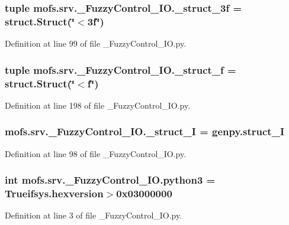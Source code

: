 \subsubsection[{\-\_\-struct\-\_\-3f}]{\setlength{\rightskip}{0pt plus 5cm}tuple mofs.\-srv.\-\_\-\-Fuzzy\-Control\-\_\-\-I\-O.\-\_\-struct\-\_\-3f = struct.\-Struct(\char`\"{}$<$3f\char`\"{})}\label{namespacemofs_1_1srv_1_1__FuzzyControl__IO_aec43b544d356deecb1cc1cf3f0752822}


Definition at line 99 of file \-\_\-\-Fuzzy\-Control\-\_\-\-I\-O.\-py.

\subsubsection[{\-\_\-struct\-\_\-f}]{\setlength{\rightskip}{0pt plus 5cm}tuple mofs.\-srv.\-\_\-\-Fuzzy\-Control\-\_\-\-I\-O.\-\_\-struct\-\_\-f = struct.\-Struct(\char`\"{}$<$f\char`\"{})}\label{namespacemofs_1_1srv_1_1__FuzzyControl__IO_aef00ba3a8b2c053ff21547068e5c58e9}


Definition at line 198 of file \-\_\-\-Fuzzy\-Control\-\_\-\-I\-O.\-py.

\subsubsection[{\-\_\-struct\-\_\-\-I}]{\setlength{\rightskip}{0pt plus 5cm}mofs.\-srv.\-\_\-\-Fuzzy\-Control\-\_\-\-I\-O.\-\_\-struct\-\_\-\-I = genpy.\-struct\-\_\-\-I}\label{namespacemofs_1_1srv_1_1__FuzzyControl__IO_a43c021e754dcd61f014ac11e2d901841}


Definition at line 98 of file \-\_\-\-Fuzzy\-Control\-\_\-\-I\-O.\-py.

\subsubsection[{python3}]{\setlength{\rightskip}{0pt plus 5cm}int mofs.\-srv.\-\_\-\-Fuzzy\-Control\-\_\-\-I\-O.\-python3 = Trueifsys.\-hexversion$>$0x03000000}\label{namespacemofs_1_1srv_1_1__FuzzyControl__IO_a5a38b82c13b26270096091228e23ce8c}


Definition at line 3 of file \-\_\-\-Fuzzy\-Control\-\_\-\-I\-O.\-py.

